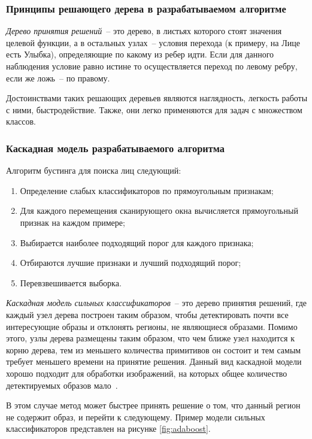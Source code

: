\subsubsection{Принципы решающего дерева в разрабатываемом алгоритме}

\textit{Дерево принятия решений}~-- это дерево, в листьях которого стоят значения целевой функции, а в остальных узлах~-- условия перехода (к
примеру, на Лице есть Улыбка), определяющие по какому из ребер идти. Если для данного наблюдения условие равно истине то
осуществляется переход по левому ребру, если же ложь~-- по правому\cite{viola_jones_2}.

Достоинствами таких решающих деревьев являются наглядность, легкость работы с ними, быстродействие. Также, они легко применяются
для задач с множеством классов.

\subsubsection{Каскадная модель разрабатываемого алгоритма}

Алгоритм бустинга для поиска лиц следующий:
\begin{enumerate}
    \item Определение слабых классификаторов по прямоугольным признакам;
    \item  Для каждого перемещения сканирующего окна вычисляется прямоугольный признак на каждом примере;
    \item Выбирается наиболее подходящий порог для каждого признака;
    \item Отбираются лучшие признаки и лучший подходящий порог;
    \item Перевзвешивается выборка.
\end{enumerate}

\textit{Каскадная модель сильных классификаторов}~-- это дерево принятия решений, где каждый узел дерева построен таким
образом, чтобы детектировать почти все интересующие образы и отклонять регионы, не являющиеся образами. Помимо этого, узлы дерева
размещены таким образом, что чем ближе узел находится к корню дерева, тем из меньшего количества примитивов он состоит и тем самым
требует меньшего времени на принятие решения. Данный вид каскадной модели хорошо подходит для обработки изображений, на которых
общее количество детектируемых образов мало~\cite{viola_jones_2}.

В этом случае метод может быстрее принять решение о том, что данный регион не содержит образ, и перейти к следующему.
Пример модели сильных классификаторов представлен на рисунке \ref{fig:adaboost}.

